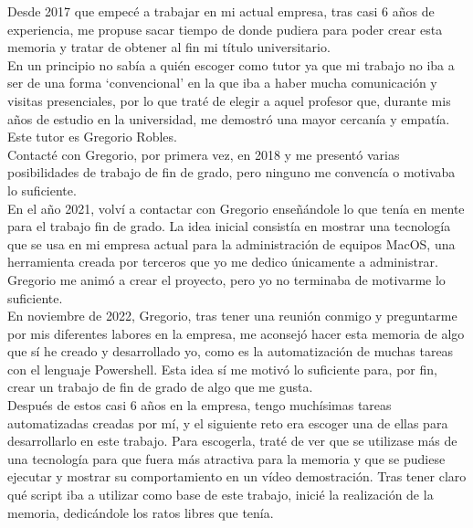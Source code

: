 \documentclass[a4paper, 12pt]{book}
\begin{document}
Desde 2017 que empecé a trabajar en mi actual empresa, tras casi 6 años de experiencia, me propuse sacar tiempo de donde pudiera para poder crear esta memoria y tratar de obtener al fin mi título universitario.
\\

En un principio no sabía a quién escoger como tutor ya que mi trabajo no iba a ser de una forma ‘convencional’ en la que iba a haber mucha comunicación y visitas presenciales, por lo que traté de elegir a aquel profesor que, durante mis años de estudio en la universidad, me demostró una mayor cercanía y empatía. Este tutor es Gregorio Robles.
\\

Contacté con Gregorio, por primera vez, en 2018 y me presentó varias posibilidades de trabajo de fin de grado, pero ninguno me convencía o motivaba lo suficiente.
\\

En el año 2021, volví a contactar con Gregorio enseñándole lo que tenía en mente para el trabajo fin de grado. La idea inicial consistía en mostrar una tecnología que se usa en mi empresa actual para la administración de equipos MacOS, una herramienta creada por terceros que yo me dedico únicamente a administrar. Gregorio me animó a crear el proyecto, pero yo no terminaba de motivarme lo suficiente.
\\

En noviembre de 2022, Gregorio, tras tener una reunión conmigo y preguntarme por mis diferentes labores en la empresa, me aconsejó hacer esta memoria de algo que sí he creado y desarrollado yo, como es la automatización de muchas tareas con el lenguaje Powershell. Esta idea sí me motivó lo suficiente para, por fin, crear un trabajo de fin de grado de algo que me gusta.
\\

Después de estos casi 6 años en la empresa, tengo muchísimas tareas automatizadas creadas por mí, y el siguiente reto era escoger una de ellas para desarrollarlo en este trabajo. Para escogerla, traté de ver que se utilizase más de una tecnología para que fuera más atractiva para la memoria y que se pudiese ejecutar y mostrar su comportamiento en un vídeo demostración. Tras tener claro qué script iba a utilizar como base de este trabajo, inicié la realización de la memoria, dedicándole los ratos libres que tenía.

\end{document}
